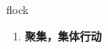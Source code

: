 
\begin{frame}
{\huge flock}
\begin{center}
\begin{enumerate}\Large
  \item \textbf{聚集，集体行动}
\end{enumerate}
\end{center}
\end{frame}
